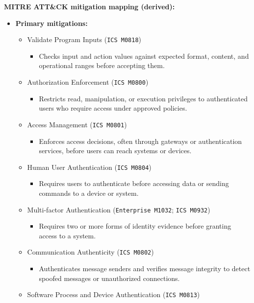 \documentclass[10pt,a4paper,oneside]{report}
\begin{document}
\textbf{MITRE ATT\&CK mitigation mapping (derived):}

\begin{itemize}
\item \textbf{Primary mitigations:}
\begin{itemize}
\item Validate Program Inputs (\texttt{ICS M0818})
\begin{itemize}
\item Checks input and action values against expected format, content, and operational ranges before accepting them.
\end{itemize}
\item Authorization Enforcement (\texttt{ICS M0800})
\begin{itemize}
\item Restricts read, manipulation, or execution privileges to authenticated users who require access under approved policies.
\end{itemize}
\item Access Management (\texttt{ICS M0801})
\begin{itemize}
\item Enforces access decisions, often through gateways or authentication services, before users can reach systems or devices.
\end{itemize}
\item Human User Authentication (\texttt{ICS M0804})
\begin{itemize}
\item Requires users to authenticate before accessing data or sending commands to a device or system.
\end{itemize}
\item Multi-factor Authentication (\texttt{Enterprise M1032}; \texttt{ICS M0932})
\begin{itemize}
\item Requires two or more forms of identity evidence before granting access to a system.
\end{itemize}
\item Communication Authenticity (\texttt{ICS M0802})
\begin{itemize}
\item Authenticates message senders and verifies message integrity to detect spoofed messages or unauthorized connections.
\end{itemize}
\item Software Process and Device Authentication (\texttt{ICS M0813})
\begin{itemize}

\end{itemize}
\end{itemize}
\end{itemize}
\end{document}
